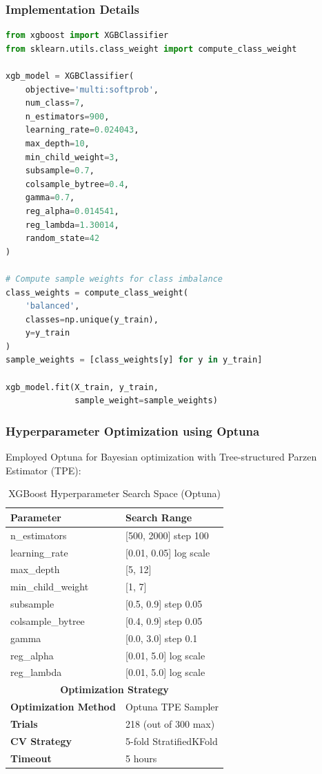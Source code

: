 \documentclass[12pt,a4paper]{article}
\begin{document}
\subsubsection{Implementation Details}
\begin{lstlisting}[language=Python]
from xgboost import XGBClassifier
from sklearn.utils.class_weight import compute_class_weight

xgb_model = XGBClassifier(
    objective='multi:softprob',
    num_class=7,
    n_estimators=900,
    learning_rate=0.024043,
    max_depth=10,
    min_child_weight=3,
    subsample=0.7,
    colsample_bytree=0.4,
    gamma=0.7,
    reg_alpha=0.014541,
    reg_lambda=1.30014,
    random_state=42
)

# Compute sample weights for class imbalance
class_weights = compute_class_weight(
    'balanced',
    classes=np.unique(y_train),
    y=y_train
)
sample_weights = [class_weights[y] for y in y_train]

xgb_model.fit(X_train, y_train,
              sample_weight=sample_weights)
\end{lstlisting}

\subsubsection{Hyperparameter Optimization using Optuna}
Employed Optuna for Bayesian optimization with Tree-structured Parzen Estimator (TPE):

\begin{table}[H]
\centering
\caption{XGBoost Hyperparameter Search Space (Optuna)}
\begin{tabular}{ll}
\toprule
\textbf{Parameter} & \textbf{Search Range} \\
\midrule
n\_estimators & [500, 2000] step 100 \\
learning\_rate & [0.01, 0.05] log scale \\
max\_depth & [5, 12] \\
min\_child\_weight & [1, 7] \\
subsample & [0.5, 0.9] step 0.05 \\
colsample\_bytree & [0.4, 0.9] step 0.05 \\
gamma & [0.0, 3.0] step 0.1 \\
reg\_alpha & [0.01, 5.0] log scale \\
reg\_lambda & [0.01, 5.0] log scale \\
\midrule
\multicolumn{2}{c}{\textbf{Optimization Strategy}} \\
\midrule
\textbf{Optimization Method} & Optuna TPE Sampler \\
\textbf{Trials} & 218 (out of 300 max) \\
\textbf{CV Strategy} & 5-fold StratifiedKFold \\
\textbf{Timeout} & 5 hours \\
\bottomrule
\end{tabular}
\end{table}
\end{document}
